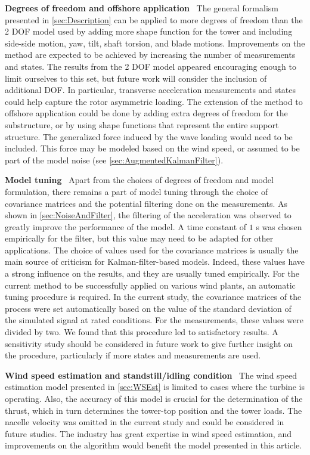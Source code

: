 \documentclass[wes, manuscript]{copernicus}
\newcommand\runinhead[1]{\par\vspace{0.3cm}\noindent\textbf{#1}\ }%
\begin{document}
\runinhead{Degrees of freedom and offshore application}
The general formalism presented in \autoref{sec:Description} can be applied to more degrees of freedom than the 2 DOF model used by adding more shape function for the tower and including side-side motion, yaw, tilt, shaft torsion, and blade motions.
Improvements on the method are expected to be achieved by increasing the number of measurements and states. 
The results from the 2 DOF model appeared encouraging enough to limit ourselves to this set, but future work will consider the inclusion of additional DOF.
In particular, transverse acceleration measurements and states could help capture the rotor asymmetric loading.
The extension of the method to offshore application could be done by adding extra degrees of freedom for the substructure, or by using shape functions that represent the entire support structure. The generalized force induced by the wave loading would need to be included. 
This force may be modeled based on the wind speed, or assumed to be part of the model noise (see \autoref{sec:AugmentedKalmanFilter}).

\runinhead{Model tuning}
Apart from  the choices of degrees of freedom and model formulation, there remains a part of model tuning through the choice of covariance matrices and the potential filtering done on the measurements.
As shown in \autoref{sec:NoiseAndFilter}, the filtering of the acceleration was observed to greatly improve the performance of the model. A time constant of $1$ \unit{s} was chosen empirically for the filter, but this value may need to be adapted for other applications. 
The choice of values used for the covariance matrices is usually the main source of criticism for Kalman-filter-based models. 
Indeed, these values have a strong influence on the results, and they are usually tuned empirically. 
For the current method to be successfully applied on various wind plants, an automatic tuning procedure is required. 
In the current study, the covariance matrices of the process were set automatically based on the value of the standard deviation of the simulated signal at rated conditions. For the measurements, these values were divided by two. 
We found that this procedure led to satisfactory results. A sensitivity study should be considered in future work to give further insight on the procedure, particularly if more states and measurements are used.


\runinhead{Wind speed estimation and standstill/idling condition}
The wind speed estimation model presented in \autoref{sec:WSEst} is limited to cases where the turbine is operating.
Also, the accuracy of this model is crucial for the determination of the thrust, which in turn determines the tower-top position and the tower loads. 
The nacelle velocity was omitted in the current study and could be considered in future studies. The industry has great expertise in wind speed estimation, and improvements on the algorithm would benefit the model presented in this article. 
        
\end{document}

